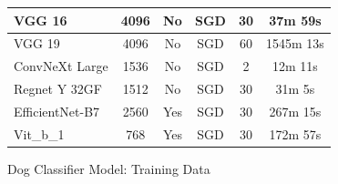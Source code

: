 \documentclass{article}
\begin{document}
\begin{figure}[h]
\begin{tabular}{|l|c|c|c|c|c|}
VGG 16                               & 4096                                                                                            & No                                                                            & SGD                & 30                                                                          & 37m 59s                                                           \\ \hline
VGG 19                               & 4096                                                                                            & No                                                                            & SGD                & 60                                                                          & 1545m 13s                                                         \\ \hline
ConvNeXt Large                       & 1536                                                                                            & No                                                                            & SGD                & 2                                                                           & 12m 11s                                                           \\ \hline
Regnet Y 32GF                       & 1512                                                                                            & No                                                                            & SGD                & 30                                                                          & 31m 5s                                                            \\ \hline
EfficientNet-B7                      & 2560                                                                                            & Yes                                                                           & SGD                & 30                                                                          & 267m 15s                                                          \\ \hline
Vit\_b\_1                            & 768                                                                                             & Yes                                                                           & SGD                & 30                                                                          & 172m 57s                                                          \\ \hline
\end{tabular}
\caption{Dog Classifier Model: Training Data}
\label{fig:model2-train}
\end{figure}
\end{document}
